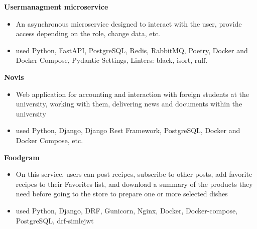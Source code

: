 \documentclass{clean_cv}
\begin{document}
\textbf{Usermanagment microservice}
\begin{itemize}
    \item  An asynchronous microservice designed to interact with the user, provide access depending on the role, change data, etc.
    \item used Python, FastAPI, PostgreSQL, Redis, RabbitMQ, Poetry, Docker and Docker Compose, Pydantic Settings, Linters: black, isort, ruff.
    \end{itemize}
    \vspace{0.5cm}

\textbf{Novis}
\begin{itemize}
    \item  Web application for accounting and interaction with foreign students at the university, working with them, delivering news and documents within the university
    \item used Python, Django, Django Rest Framework, PostgreSQL, Docker and Docker Compose, etc. 
    \end{itemize}
    \vspace{0.5cm}

\textbf{Foodgram}\href{https://github.com/Chinpakamon/foodgram-project-react}{\color{blue}}
 \begin{itemize}
   \item  On this service, users can post recipes, subscribe to other posts, add favorite recipes to their Favorites list, and download a summary of the products they need before going to the store to prepare one or more selected dishes
   \item used Python, Django, DRF, Gunicorn, Nginx, Docker, Docker-compose, PostgreSQL, drf-simlejwt
   \end{itemize}
\end{document}
